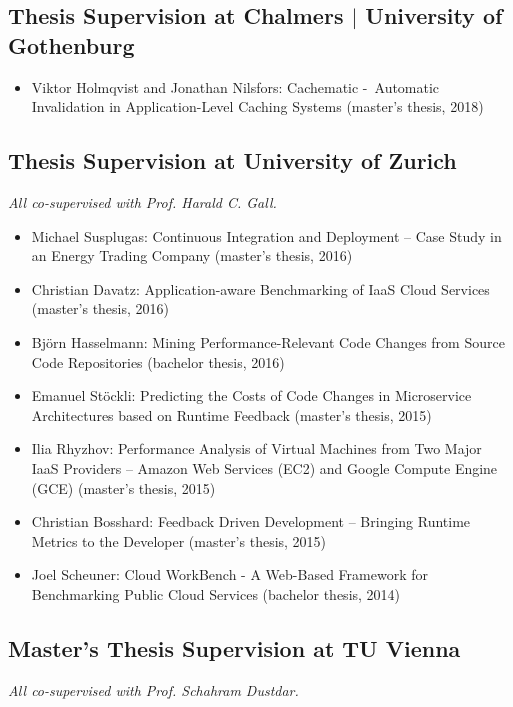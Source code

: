 \documentclass[paper=letter,fontsize=11pt]{scrartcl} %
\begin{document}
\subsection*{Thesis Supervision at Chalmers $|$ University of Gothenburg}

\begin{itemize}
  \item Viktor Holmqvist and Jonathan Nilsfors: Cachematic - Automatic Invalidation in Application-Level Caching Systems (master's thesis, 2018)
\end{itemize}

\subsection*{Thesis Supervision at University of Zurich}

\emph{All co-supervised with Prof. Harald C. Gall.}

\begin{itemize}
  \item Michael Susplugas: Continuous Integration and Deployment -- Case Study in an Energy Trading Company (master's thesis, 2016)
	\item Christian Davatz: Application-aware Benchmarking of IaaS Cloud Services (master's thesis, 2016)
	\item Bj\"orn Hasselmann: Mining Performance-Relevant Code Changes from Source Code Repositories (bachelor thesis, 2016)
  \item Emanuel St\"ockli: Predicting the Costs of Code Changes in Microservice Architectures based on Runtime Feedback  (master's thesis, 2015)
  \item Ilia Rhyzhov: Performance Analysis of Virtual Machines from Two Major IaaS Providers -- Amazon Web Services (EC2) and Google Compute Engine (GCE)  (master's thesis, 2015)
  \item Christian Bosshard: Feedback Driven Development -- Bringing Runtime Metrics to the Developer  (master's thesis, 2015)
  \item Joel Scheuner: Cloud WorkBench - A Web-Based Framework for Benchmarking Public Cloud Services (bachelor thesis, 2014)
\end{itemize}

\subsection*{Master's Thesis Supervision at TU Vienna}

\emph{All co-supervised with Prof. Schahram Dustdar.}
\end{document}
